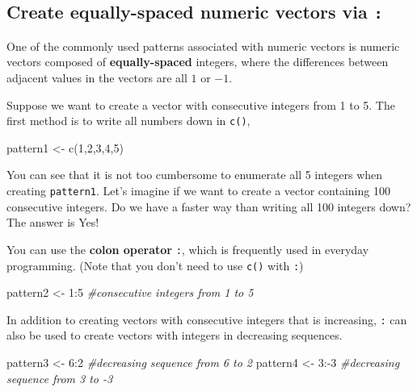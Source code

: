 \documentclass[
]{book}
\newenvironment{Shaded}{\begin{snugshade}}{\end{snugshade}}
\newcommand{\CommentTok}[1]{\textcolor[rgb]{0.56,0.35,0.01}{\textit{#1}}}
\newcommand{\DecValTok}[1]{\textcolor[rgb]{0.00,0.00,0.81}{#1}}
\newcommand{\FunctionTok}[1]{\textcolor[rgb]{0.00,0.00,0.00}{#1}}
\newcommand{\NormalTok}[1]{#1}
\newcommand{\OtherTok}[1]{\textcolor[rgb]{0.56,0.35,0.01}{#1}}
\newcommand{\SpecialCharTok}[1]{\textcolor[rgb]{0.00,0.00,0.00}{#1}}
\begin{document}
\hypertarget{create-equally-spaced-numeric-vectors-via}{%
\subsection{\texorpdfstring{Create equally-spaced numeric vectors via \texttt{:}}{Create equally-spaced numeric vectors via :}}\label{create-equally-spaced-numeric-vectors-via}}

One of the commonly used patterns associated with numeric vectors is numeric vectors composed of \textbf{equally-spaced} integers, where the differences between adjacent values in the vectors are all \(1\) or \(-1\).

Suppose we want to create a vector with consecutive integers from 1 to 5. The first method is to write all numbers down in \texttt{c()},

\begin{Shaded}
\begin{Highlighting}[]
\NormalTok{pattern1 }\OtherTok{\textless{}{-}} \FunctionTok{c}\NormalTok{(}\DecValTok{1}\NormalTok{,}\DecValTok{2}\NormalTok{,}\DecValTok{3}\NormalTok{,}\DecValTok{4}\NormalTok{,}\DecValTok{5}\NormalTok{)}
\end{Highlighting}
\end{Shaded}

You can see that it is not too cumbersome to enumerate all 5 integers when creating \texttt{pattern1}. Let's imagine if we want to create a vector containing 100 consecutive integers. Do we have a faster way than writing all 100 integers down? The answer is Yes!

You can use the \textbf{colon operator} \texttt{:}, which is frequently used in everyday programming. (Note that you don't need to use \texttt{c()} with \texttt{:})

\begin{Shaded}
\begin{Highlighting}[]
\NormalTok{pattern2 }\OtherTok{\textless{}{-}} \DecValTok{1}\SpecialCharTok{:}\DecValTok{5} \CommentTok{\#consecutive integers from 1 to 5}
\end{Highlighting}
\end{Shaded}

In addition to creating vectors with consecutive integers that is increasing, \texttt{:} can also be used to create vectors with integers in decreasing sequences.

\begin{Shaded}
\begin{Highlighting}[]
\NormalTok{pattern3 }\OtherTok{\textless{}{-}} \DecValTok{6}\SpecialCharTok{:}\DecValTok{2}  \CommentTok{\#decreasing sequence from 6 to 2}
\NormalTok{pattern4 }\OtherTok{\textless{}{-}} \DecValTok{3}\SpecialCharTok{:{-}}\DecValTok{3} \CommentTok{\#decreasing sequence from 3 to {-}3}
\end{Highlighting}
\end{Shaded}
\end{document}
